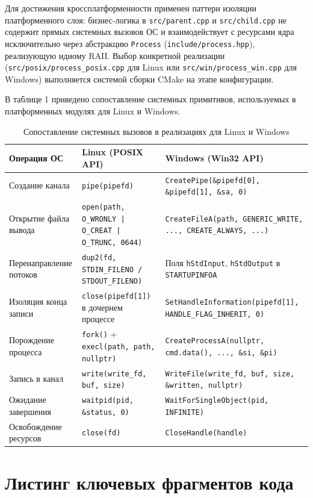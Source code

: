\documentclass[11pt, a4paper]{article}
\begin{document}
Для достижения кроссплатформенности применен паттерн изоляции платформенного слоя: бизнес-логика в \texttt{src/parent.cpp} и \texttt{src/child.cpp} не содержит прямых системных вызовов ОС и взаимодействует с ресурсами ядра исключительно через абстракцию \texttt{Process} (\texttt{include/process.hpp}), реализующую идиому RAII. Выбор конкретной реализации (\texttt{src/posix/process\_posix.cpp} для Linux или \texttt{src/win/process\_win.cpp} для Windows) выполняется системой сборки CMake на этапе конфигурации.

В таблице 1 приведено сопоставление системных примитивов, используемых в платформенных модулях для Linux и Windows.

\begin{table}[h!]
\centering
\small
\begin{tabularx}{\textwidth}{l X X}
\toprule
\textbf{Операция ОС} & \textbf{Linux (POSIX API)} & \textbf{Windows (Win32 API)} \\
\midrule
Создание канала & \texttt{pipe(pipefd)} & \texttt{CreatePipe(\&pipefd[0], \&pipefd[1], \&sa, 0)} \\
Открытие файла вывода & \texttt{open(path, O\_WRONLY | O\_CREAT | O\_TRUNC, 0644)} & \texttt{CreateFileA(path, GENERIC\_WRITE, ..., CREATE\_ALWAYS, ...)} \\
Перенаправление потоков & \texttt{dup2(fd, STDIN\_FILENO / STDOUT\_FILENO)} & Поля \texttt{hStdInput}, \texttt{hStdOutput} в \texttt{STARTUPINFOA} \\
Изоляция конца записи & \texttt{close(pipefd[1])} в дочернем процессе & \texttt{SetHandleInformation(pipefd[1], HANDLE\_FLAG\_INHERIT, 0)} \\
Порождение процесса & \texttt{fork()} + \texttt{execl(path, path, nullptr)} & \texttt{CreateProcessA(nullptr, cmd.data(), ..., \&si, \&pi)} \\
Запись в канал & \texttt{write(write\_fd, buf, size)} & \texttt{WriteFile(write\_fd, buf, size, \&written, nullptr)} \\
Ожидание завершения & \texttt{waitpid(pid, \&status, 0)} & \texttt{WaitForSingleObject(pid, INFINITE)} \\
Освобождение ресурсов & \texttt{close(fd)} & \texttt{CloseHandle(handle)} \\
\bottomrule
\end{tabularx}
\caption{Сопоставление системных вызовов в реализациях для Linux и Windows}
\end{table}

\section{Листинг ключевых фрагментов кода}
\end{document}
